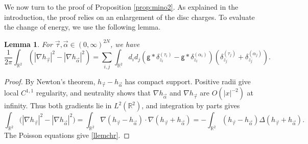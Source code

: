 \documentclass[a4paper,10pt,leqno]{amsart}
\numberwithin{equation}{section}
\newtheorem{lem}[prop]{Lemma}
\newcommand{\R}{\mathbb{R}}
\def\nab{\nabla}
\def\g{\mathsf{g}}
\begin{document}
We now turn to the proof of Proposition \ref{prop:mino2}.
As explained in the introduction, the proof relies on an enlargement of the disc charges. To evaluate the change of energy, we use the following lemma.

\begin{lem}\label{lemchr} For $\vec{\tau},\vec{\alpha}\in(0,\infty)^{2N}$, we have
  \begin{equation}
    \label{llemchr}
    \frac{1}{2\pi}\int_{\R^2}\left( |\nab h_{\vec{\tau}}|^2-|\nab h_{\vec{\alpha}}|^2\right) =\sum_{i,j} \int_{\R^2} d_i d_j
    \left(\g*\delta_{z_i}^{(\tau_i)} - \g* \delta_{z_i}^{(\alpha_i)} \right)
    \left( \delta_{z_j}^{(\tau_j)}+\delta_{z_j}^{(\alpha_j)} \right).\end{equation}

\end{lem}
\begin{proof}
  By Newton's theorem, $h_{\vec\tau}-h_{\vec\alpha}$ has compact support. Positive radii give local $C^{1,1}$ regularity, and neutrality shows that $\nab h_{\vec\alpha}$ and $\nab h_{\vec\tau}$ are $O(|x|^{-2})$ at infinity. Thus both gradients lie in $L^2(\R^2)$, and integration by parts gives
  \[
    \int_{\R^2}\bigl(|\nab h_{\vec\tau}|^2-|\nab h_{\vec\alpha}|^2\bigr)
    =\int_{\R^2}\nab(h_{\vec\tau}-h_{\vec\alpha})\cdot\nab(h_{\vec\tau}+h_{\vec\alpha})
    =-\int_{\R^2}(h_{\vec\tau}-h_{\vec\alpha})\Delta(h_{\vec\tau}+h_{\vec\alpha}).
  \]
  The Poisson equations give \eqref{llemchr}.
\end{proof}
\end{document}
